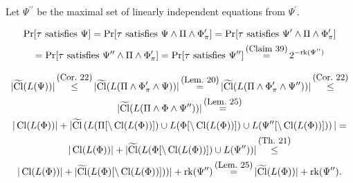 Let $\Psi^{\prime\prime}$ be the maximal set of linearly independent equations from $\Psi^{\prime}$.\par





 
\[\begin{gathered}\Pr[\tau\mbox{ satisfies }\Psi]=\Pr[\tau\mbox{ satisfies }\Psi\land\Pi\land\Phi^{\prime}_{\pi}]=\Pr[\tau\mbox{ satisfies }\Psi^{\prime}\land\Pi\land\Phi^{\prime}_{\pi}]\\
=\Pr[\tau\mbox{ satisfies }\Psi^{\prime\prime}\land\Pi\land\Phi^{\prime}_{\pi}]=\Pr[\tau\mbox{ satisfies }\Psi^{\prime\prime}]\mathop{=}\limits^{\mbox{\small(Claim\leavevmode\nobreak\ 39)}}2^{-\mathrm{rk}(\Psi^{\prime\prime})}\end{gathered}\] 
 








 
\[\begin{gathered}|\widetilde{\mathop{\mathrm{Cl}}}(L(\Psi))|\mathop{\leq}\limits^{\mbox{\small(Cor.\leavevmode\nobreak\ 22)}}|\widetilde{\mathop{\mathrm{Cl}}}(L(\Pi\land\Phi^{\prime}_{\pi}\land\Psi))|\mathop{=}\limits^{\mbox{\small(Lem.\leavevmode\nobreak\ 20)}}|\widetilde{\mathop{\mathrm{Cl}}}(L(\Pi\land\Phi^{\prime}_{\pi}\land\Psi^{\prime\prime}))|\mathop{\leq}\limits^{\mbox{\small(Cor.\leavevmode\nobreak\ 22)}}\\
|\widetilde{\mathop{\mathrm{Cl}}}(L(\Pi\land\Phi\land\Psi^{\prime\prime}))|\mathop{=}\limits^{\mbox{\small(Lem.\leavevmode\nobreak\ 25)}}\\
|\mathop{\mathrm{Cl}}(L(\Phi))|+|\widetilde{\mathop{\mathrm{Cl}}}\left(L(\Pi[\setminus\mathop{\mathrm{Cl}}(L(\Phi))])\cup L(\Phi[\setminus\mathop{\mathrm{Cl}}(L(\Phi))])\cup L(\Psi^{\prime\prime}[\setminus\mathop{\mathrm{Cl}}(L(\Phi))])\right)|=\\
|\mathop{\mathrm{Cl}}(L(\Phi))|+|\widetilde{\mathop{\mathrm{Cl}}}(L(\Phi[\setminus\mathop{\mathrm{Cl}}(L(\Phi))])\cup L(\Psi^{\prime\prime}))|\mathop{\leq}\limits^{\mbox{\small(Th.\leavevmode\nobreak\ 21)}}\\
|\mathop{\mathrm{Cl}}(L(\Phi))|+|\widetilde{\mathop{\mathrm{Cl}}}(L(\Phi)[\setminus\mathop{\mathrm{Cl}}(L(\Phi))]))|+\mathrm{rk}(\Psi^{\prime\prime})\mathop{=}\limits^{\mbox{\small(Lem.\leavevmode\nobreak\ 25)}}|\widetilde{\mathop{\mathrm{Cl}}}(L(\Phi))|+\mathrm{rk}(\Psi^{\prime\prime}).\end{gathered}\] 
 





